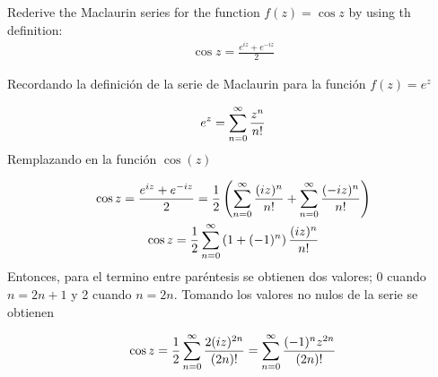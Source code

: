 \begin{problem}{4}
    Rederive the Maclaurin series for the function $f(z) = \cos z$ by using th definition:
    \begin{gather}
        \cos z = \frac{e^{iz} + e^{-iz}}{2}
    \end{gather}    
\end{problem}

Recordando la definición de la serie de Maclaurin para la función $f(z) = e^{z}$

\begin{gather}
    e^{z} = \sum_{n = 0}^{\infty} \frac{z^n}{n!}
\end{gather}
Remplazando en la función $\cos(z)$

\begin{gather*}
    \cos z = \frac{e^{iz} + e^{-iz}}{2} = \frac{1}{2}\left(\sum_{n = 0}^{\infty} \frac{(iz)^n}{n!} + \sum_{n = 0}^{\infty} \frac{(-iz)^n}{n!}\right)\\
    \cos z = \frac{1}{2}\sum_{n = 0}^{\infty}\left( 1 + (-1)^n\right)\frac{(iz)^n}{n!}
\end{gather*}
Entonces, para el termino entre paréntesis se obtienen dos valores; 0  cuando $n = 2n + 1$ y 2 cuando $n = 2n$. Tomando los valores no nulos de la serie se obtienen

\begin{mdframed}
    \vspace{-0.4 cm}
    \begin{gather}
        \cos z = \frac{1}{2}\sum_{n = 0}^{\infty} \frac{2(iz)^{2n}}{(2n)!} = \sum_{n = 0}^{\infty} \frac{(-1)^n z^{2n}}{(2n)!}
    \end{gather}
\end{mdframed}


